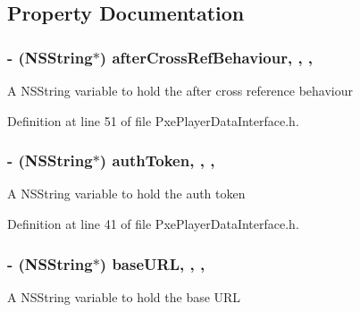 \subsection{Property Documentation}
\hypertarget{interface_pxe_player_data_interface_a3a406ada658778aecd037ebe9bde9cb9}{
\subsubsection[{after\-Cross\-Ref\-Behaviour}]{\setlength{\rightskip}{0pt plus 5cm}-\/ (N\-S\-String$\ast$) after\-Cross\-Ref\-Behaviour\hspace{0.3cm}{\ttfamily [read]}, {\ttfamily [write]}, {\ttfamily [nonatomic]}, {\ttfamily [strong]}}}\label{interface_pxe_player_data_interface_a3a406ada658778aecd037ebe9bde9cb9}
A N\-S\-String variable to hold the after cross reference behaviour 

Definition at line 51 of file Pxe\-Player\-Data\-Interface.\-h.

\hypertarget{interface_pxe_player_data_interface_a98548be4b0f323ff768a5bf22f3f11c1}{
\subsubsection[{auth\-Token}]{\setlength{\rightskip}{0pt plus 5cm}-\/ (N\-S\-String$\ast$) auth\-Token\hspace{0.3cm}{\ttfamily [read]}, {\ttfamily [write]}, {\ttfamily [nonatomic]}, {\ttfamily [strong]}}}\label{interface_pxe_player_data_interface_a98548be4b0f323ff768a5bf22f3f11c1}
A N\-S\-String variable to hold the auth token 

Definition at line 41 of file Pxe\-Player\-Data\-Interface.\-h.

\hypertarget{interface_pxe_player_data_interface_a0c22a98d7e29a36bcf024bb58c58aad8}{
\subsubsection[{base\-U\-R\-L}]{\setlength{\rightskip}{0pt plus 5cm}-\/ (N\-S\-String$\ast$) base\-U\-R\-L\hspace{0.3cm}{\ttfamily [read]}, {\ttfamily [write]}, {\ttfamily [nonatomic]}, {\ttfamily [strong]}}}\label{interface_pxe_player_data_interface_a0c22a98d7e29a36bcf024bb58c58aad8}
A N\-S\-String variable to hold the base U\-R\-L 

